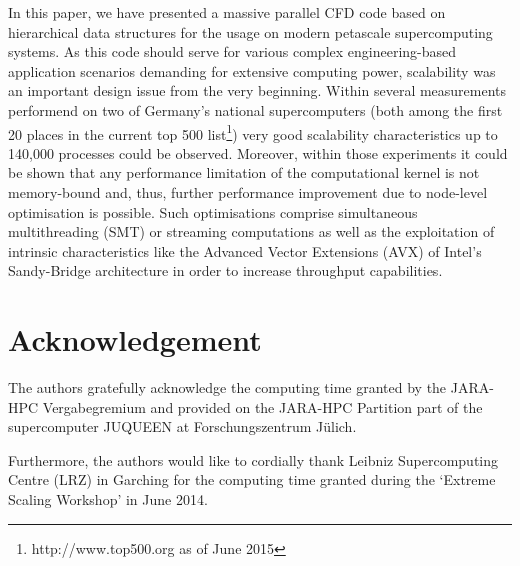 \documentclass[10pt, conference, compsocconf]{IEEEtran}
\begin{document}
In this paper, we have presented a massive parallel CFD code based on hierarchical data structures for the usage on modern petascale supercomputing systems. As this code should serve for various complex engineering-based application scenarios demanding for extensive computing power, scalability was an important design issue from the very beginning. Within several measurements performend on two of Germany's national supercomputers (both among the first 20 places in the current top 500 list\footnote{http://www.top500.org as of June 2015}) very good scalability characteristics up to 140,000 processes could be observed. Moreover, within those experiments it could be shown that any performance limitation of the computational kernel is not memory-bound and, thus, further performance improvement due to node-level optimisation is possible. Such optimisations comprise simultaneous multithreading (SMT) or streaming computations as well as the exploitation of intrinsic characteristics like the Advanced Vector Extensions (AVX) of Intel's Sandy-Bridge architecture in order to increase throughput capabilities.


\section{Acknowledgement} %

The authors gratefully acknowledge the computing time granted by the JARA-HPC Vergabegremium and provided on the JARA-HPC Partition part of the supercomputer JUQUEEN \cite{Juqueen2015} at Forschungszentrum J\"ulich.

Furthermore, the authors would like to cordially thank Leibniz Supercomputing Centre (LRZ) in Garching for the computing time granted during the `Extreme Scaling Workshop' in June 2014.



%

\end{document}
